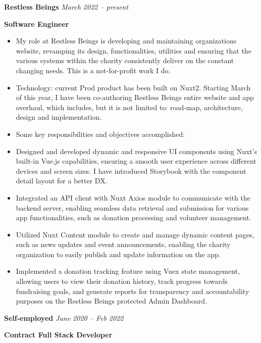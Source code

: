 \documentclass[11pt, oneside]{article}
\begin{document}
\medskip

\textbf{Restless Beings}
\hfill
\textit{March 2022 – present}

\textbf{Software Engineer}

\begin{itemize} 
  \item My role at Restless Beings is developing and maintaining organizations website, revamping its design, functionalities, utilities and ensuring that the various systems within the charity consistently deliver on the constant changing needs. This is a not-for-profit work I do.
  \item Technology: current Prod product has been built on Nuxt2. Starting March of this year, I have been co-authoring Restless Beings entire website and app overhaul, which includes, but it is not limited to: road-map, architecture, design and implementation.
  \item Some key responsibilities and objectives accomplished:
  \item Designed and developed dynamic and responsive UI components using Nuxt's built-in Vue.js capabilities, ensuring a smooth user experience across different devices and screen sizes. I have introduced Storybook with the component detail layout for a better DX.
  \item Integrated an API client with Nuxt Axios module to communicate with the backend server, enabling seamless data retrieval and submission for various app functionalities, such as donation processing and volunteer management.
  \item Utilized Nuxt Content module to create and manage dynamic content pages, such as news updates and event announcements, enabling the charity organization to easily publish and update information on the app.
  \item Implemented a donation tracking feature using Vuex state management, allowing users to view their donation history, track progress towards fundraising goals, and generate reports for transparency and accountability purposes on the Restless Beings protected Admin Dashboard.

\end{itemize}

\medskip

\textbf{Self-employed}
\hfill
\textit{June 2020 – Feb 2022}

\textbf{Contract Full Stack Developer}
\end{document}
